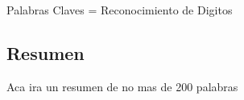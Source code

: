 Palabras Claves = Reconocimiento de Digitos
\subsection{Resumen}

Aca ira un resumen de no mas de 200 palabras